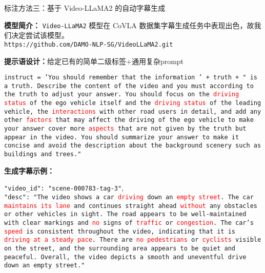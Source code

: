 \documentclass[serif]{beamer}
\begin{document}
\begin{frame}{标注方法三：基于 Video-LLaMA2 的自动字幕生成}

\scriptsize

\textbf{模型简介：} \texttt{Video-LLaMA2} 模型在 CoVLA 数据集字幕生成任务中表现出色，故我们决定尝试该模型。\\
\texttt{https://github.com/DAMO-NLP-SG/VideoLLaMA2.git}

\vspace{0.3em}
\textbf{提示语设计：}给定已有的简单二级标签+通用复杂prompt

\texttt{instruct = 'You should remember that the information ' + truth + " is a truth. Describe the content of the video and you must according to the truth to adjust your answer. You should focus on the \textcolor{red}{driving status} of the ego vehicle itself and the \textcolor{red}{driving status} of the leading vehicle, the \textcolor{red}{interactions} with other road users in detail, and add any other \textcolor{red}{factors} that may affect the driving of the ego vehicle to make your answer cover more \textcolor{red}{aspects} that are not given by the truth but appear in the video. You should summarize your answer to make it concise and avoid the description about the background scenery such as buildings and trees."}

\vspace{0.3em}
\textbf{生成字幕示例：}

\texttt{"video\_id": "scene-000783-tag-3"},\\
\texttt{"desc": "The video shows a car \textcolor{red}{driving} down an  \textcolor{red}{empty street}. The car \textcolor{red}{maintains its lane} and continues straight ahead \textcolor{red}{without} any obstacles or other vehicles in sight. The road appears to be well-maintained with clear markings and \textcolor{red}{no} signs of \textcolor{red}{traffic} or \textcolor{red}{congestion}. The car's \textcolor{red}{speed} is consistent throughout the video, indicating that it is \textcolor{red}{driving at a steady pace}. There are \textcolor{red}{no pedestrians} or \textcolor{red}{cyclists} visible on the street, and the surrounding area appears to be quiet and peaceful. Overall, the video depicts a smooth and uneventful drive down an empty street."}

\normalsize

\end{frame}
\end{document}

